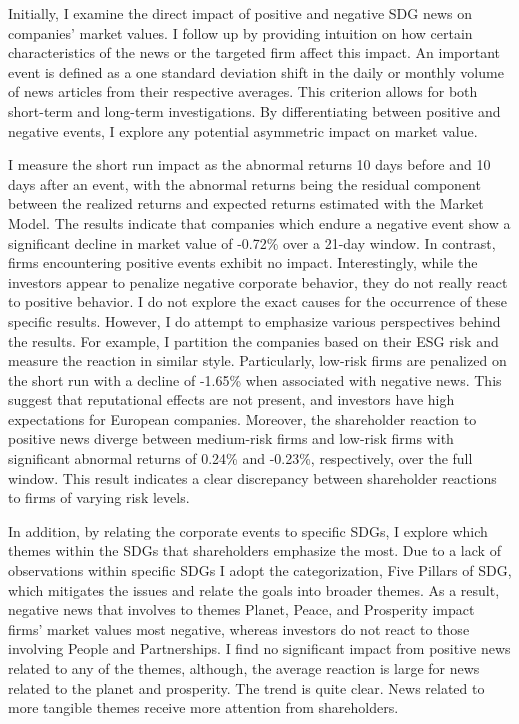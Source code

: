 Initially, I examine the direct impact of positive and negative SDG news on companies' market values. I follow up by providing intuition on how certain characteristics of the news or the targeted firm affect this impact.
An important event is defined as a one standard deviation shift in the daily or monthly volume of news articles from their respective averages. This criterion allows for both short-term and long-term investigations. By differentiating between positive and negative events, I explore any potential asymmetric impact on market value. 

I measure the short run impact as the abnormal returns 10 days before and 10 days after an event, with the abnormal returns being the residual component between the realized returns and expected returns estimated with the Market Model. The results indicate that companies which endure a negative event show a significant decline in market value of -0.72\% over a 21-day window. In contrast, firms encountering positive events exhibit no impact. Interestingly, while the investors appear to penalize negative corporate behavior, they do not really react to positive behavior. I do not explore the exact causes for the occurrence of these specific results. However, I do attempt to emphasize various perspectives behind the results. For example, I partition the companies based on their ESG risk and measure the reaction in similar style. Particularly, low-risk firms are penalized on the short run with a decline of -1.65\% when associated with negative news. This suggest that reputational effects are not present, and investors have high expectations for European companies. Moreover, the shareholder reaction to positive news diverge between medium-risk firms and low-risk firms with significant abnormal returns of 0.24\% and -0.23\%, respectively, over the full window. This result indicates a clear discrepancy between shareholder reactions to firms of varying risk levels. 

In addition, by relating the corporate events to specific SDGs, I explore which themes within the SDGs that shareholders emphasize the most. Due to a lack of observations within specific SDGs I adopt the categorization, Five Pillars of SDG, which mitigates the issues and relate the goals into broader themes. As a result, negative news that involves to themes Planet, Peace, and Prosperity impact firms' market values most negative, whereas investors do not react to those involving People and Partnerships. I find no significant impact from positive news related to any of the themes, although, the average reaction is large for news related to the planet and prosperity. The trend is quite clear. News related to more tangible themes receive more attention from shareholders.  

